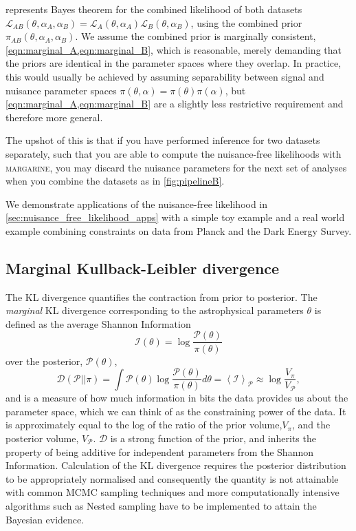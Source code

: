  represents Bayes theorem for the combined likelihood of both  datasets $\mathcal{L}_{AB}(\theta,\alpha_A,\alpha_B) = \mathcal{L}_A(\theta,\alpha_A)\mathcal{L}_B(\theta,\alpha_B)$, using the combined prior $\pi_{AB}(\theta,\alpha_A,\alpha_B)$. We assume the combined prior is marginally consistent, \cref{eqn:marginal_A,eqn:marginal_B}, which is reasonable, merely demanding that the priors are identical in the parameter spaces where they overlap. In practice, this would usually be achieved by assuming separability between signal and nuisance parameter spaces $\pi(\theta,\alpha) = \pi(\theta)\pi(\alpha)$, but \cref{eqn:marginal_A,eqn:marginal_B} are a slightly less restrictive requirement and therefore more general. 

The upshot of this is that if you have performed inference for two datasets separately, such that you are able to compute the nuisance-free likelihoods with \textsc{margarine}, you may discard the nuisance parameters for the next set of analyses when you combine the datasets as in \cref{fig:pipelineB}.

We demonstrate applications of the nuisance-free likelihood in \cref{sec:nuisance_free_likelihood_apps} with a simple toy example and a real world example combining constraints on data from Planck and the Dark Energy Survey.

\subsection{Marginal Kullback-Leibler divergence}

The KL divergence quantifies the contraction from prior to posterior. The \emph{marginal} KL divergence corresponding to the astrophysical parameters $\theta$ is defined as the average Shannon Information
\begin{equation}
    \mathcal{I}(\theta) = \log\frac{\mathcal{P}(\theta)}{\pi(\theta)}
    \label{eq:shannon_entropy}
\end{equation}
over the posterior, $\mathcal{P}(\theta)$,
\begin{equation}
    \mathcal{D}(\mathcal{P}||\pi) = \int \mathcal{P}(\theta) \log\frac{\mathcal{P}(\theta)}{\pi(\theta)} d\theta = \left\langle \mathcal{I} \right\rangle_\mathcal{P} \approx \log\frac{V_\pi}{V_\mathcal{P}},
    \label{eq:kl_divergence}
\end{equation}
and is a measure of how much information in bits the data provides us about the parameter space, which we can think of as the constraining power of the data. It is approximately equal to the log of the ratio of the prior volume,$V_\pi$, and the posterior volume, $V_\mathcal{P}$. $\mathcal{D}$ is a strong function of the prior, and inherits the property of being additive for independent parameters from the Shannon Information. Calculation of the KL divergence requires the posterior distribution to be appropriately normalised and consequently the quantity is not attainable with common MCMC sampling techniques and more computationally intensive algorithms such as Nested sampling have to be implemented to attain the Bayesian evidence.

